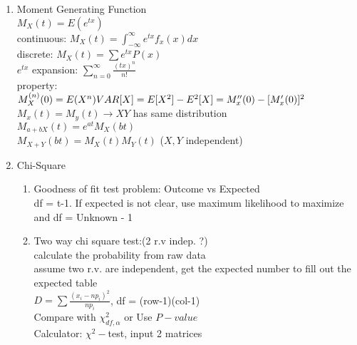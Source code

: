 \documentclass[10pt]{article}
\begin{document}
  
\begin{multicols}{2}
\begin{enumerate}
\item Moment Generating Function\\
$M_X(t) = E(e^{tx})$\\
continuous: $M_X(t) = \int_{-\infty}^{\infty}e^{tx}f_x(x)dx$\\
discrete: $M_X(t) = \sum e^{tx}P(x)$\\
$e^{tx}$ expansion: $\sum_{n = 0}^{\infty} \frac{(tx)^n}{n!}$\\
property:\\
$M_X^{(n)}(0) = E(X^n)\\
VAR[X] = E[X^2] - E^2[X] = M_x''(0) - [M_x'(0)]^2$\\
$M_x(t) = M_y(t) \rightarrow X Y$ has same distribution\\ 
$M_{a + bX}(t) = e^{at}M_X(bt)$\\
$M_{X+Y}(bt) = M_X(t)M_Y(t)$ ($X,Y$ independent)

\item Chi-Square
\begin{enumerate}
\item Goodness of fit test problem: Outcome vs Expected\\
df = t-1. If expected is not clear, use maximum likelihood to maximize and df = Unknown - 1

\item Two way chi square test:(2 r.v indep. ?)\\
	calculate the probability from raw data\\
	assume two r.v. are independent, get the expected number to fill out the expected table\\
	$D = \sum \frac{(x_i - np_i)^2}{np_i}$, df = (row-1)(col-1)\\
	Compare with $\chi^2_{df,\alpha}$ or Use $P-value$\\
	Calculator: $\chi^2-$test, input 2 matrices
\end{enumerate}


\end{enumerate}
\end{multicols}
\end{document}
